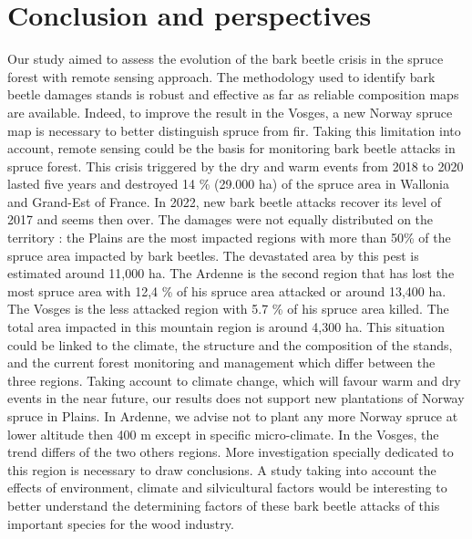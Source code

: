 \documentclass[3p,procedia]{elsarticle}
\begin{document}
\section{Conclusion and perspectives}
Our study aimed to assess the evolution of the bark beetle crisis in the spruce forest with remote sensing approach.
The methodology used to identify bark beetle damages stands is robust and effective as far as reliable composition maps are available.
Indeed, to improve the result in the Vosges, a new Norway spruce map is necessary to better distinguish spruce from fir.
Taking this limitation into account, remote sensing could be the basis for monitoring bark beetle attacks in spruce forest.
This crisis triggered by the dry and warm events from 2018 to 2020 lasted five years and destroyed 14 \% (29.000 ha) of the spruce area in Wallonia and Grand-Est of France.
In 2022, new bark beetle attacks recover its level of 2017 and seems then over.
The damages were not equally distributed on the territory : the Plains are the most impacted regions with more than 50\% of the spruce area impacted by bark beetles.
The devastated area by this pest is estimated around 11,000 ha.
The Ardenne is the second region that has lost the most spruce area with  12,4 \% of his spruce area attacked or around 13,400 ha. 
The Vosges is the less attacked region with 5.7 \% of his spruce area killed. The total area impacted in this mountain region is around 4,300 ha.
This situation could be linked to the climate, the structure and the composition of the stands, and the current forest monitoring and management which differ between the three regions.
Taking account to climate change, which will favour warm and dry events in the near future, our results does not support new plantations of Norway spruce in Plains.
In Ardenne, we advise not to plant any more Norway spruce at lower altitude then 400 m except in specific micro-climate.
In the Vosges, the trend differs of the two others regions.
More investigation specially dedicated to this region is necessary to draw conclusions.
A study taking into account the effects of environment, climate and silvicultural factors would be interesting to better understand the determining factors of these bark beetle attacks of this important species for the wood industry.

\end{document}
